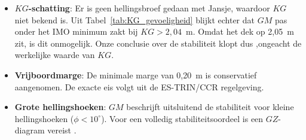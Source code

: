 \begin{itemize}
    \item \textbf{$KG$-schatting}: Er is geen hellingsbroef gedaan met Jansje,
          waardoor $KG$ niet bekend is. Uit
          Tabel~\ref{tab:KG_gevoeligheid} blijkt echter dat $GM$ pas onder
          het IMO minimum zakt bij $KG > 2{,}04$~m. Omdat het dek op
          2{,}05~m zit, is dit onmogelijk. Onze conclusie over de stabiliteit klopt dus ,ongeacht de werkelijke waarde van $KG$.

    \item \textbf{Vrijboordmarge}: De minimale marge van 0{,}20~m is
          conservatief aangenomen. De exacte eis volgt uit de ES-TRIN/CCR
          regelgeving.

    \item \textbf{Grote hellingshoeken}: $GM$ beschrijft uitsluitend de
         stabiliteit voor kleine hellingshoeken ($\phi < 10^\circ$). Voor een volledig
          stabiliteitsoordeel is een $GZ$-diagram vereist
          \cite[p.~134]{Barras2006}.
\end{itemize}

